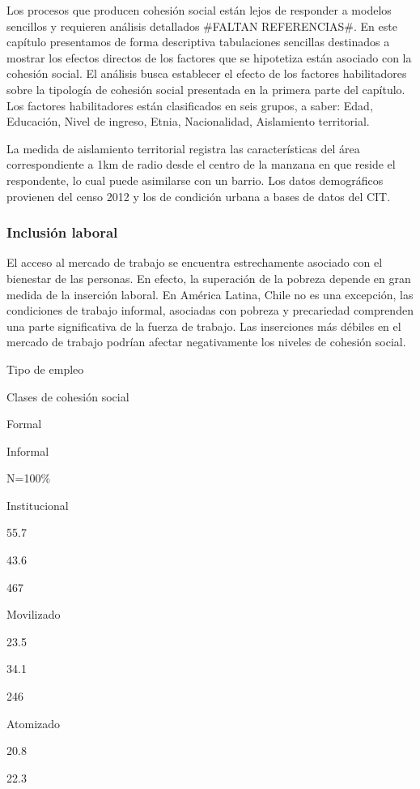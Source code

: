 \documentclass[
  12pt,
]{book}
\begin{document}
Los procesos que producen cohesión social están lejos de responder a modelos sencillos y requieren análisis detallados \#FALTAN REFERENCIAS\#. En este capítulo presentamos de forma descriptiva tabulaciones sencillas destinados a mostrar los efectos directos de los factores que se hipotetiza están asociado con la cohesión social. El análisis busca establecer el efecto de los factores habilitadores sobre la tipología de cohesión social presentada en la primera parte del capítulo. Los factores habilitadores están clasificados en seis grupos, a saber: Edad, Educación, Nivel de ingreso, Etnia, Nacionalidad, Aislamiento territorial.

La medida de aislamiento territorial registra las características del área correspondiente a 1km de radio desde el centro de la manzana en que reside el respondente, lo cual puede asimilarse con un barrio. Los datos demográficos provienen del censo 2012 y los de condición urbana a bases de datos del CIT.

\hypertarget{inclusiuxf3n-laboral}{%
\subsubsection{Inclusión laboral}\label{inclusiuxf3n-laboral}}

El acceso al mercado de trabajo se encuentra estrechamente asociado con el bienestar de las personas. En efecto, la superación de la pobreza depende en gran medida de la inserción laboral. En América Latina, Chile no es una excepción, las condiciones de trabajo informal, asociadas con pobreza y precariedad comprenden una parte significativa de la fuerza de trabajo. Las inserciones más débiles en el mercado de trabajo podrían afectar negativamente los niveles de cohesión social.

Tipo de empleo

Clases de cohesión social

Formal

Informal

N=100\%

Institucional

55.7

43.6

467

Movilizado

23.5

34.1

246

Atomizado

20.8

22.3
\end{document}

